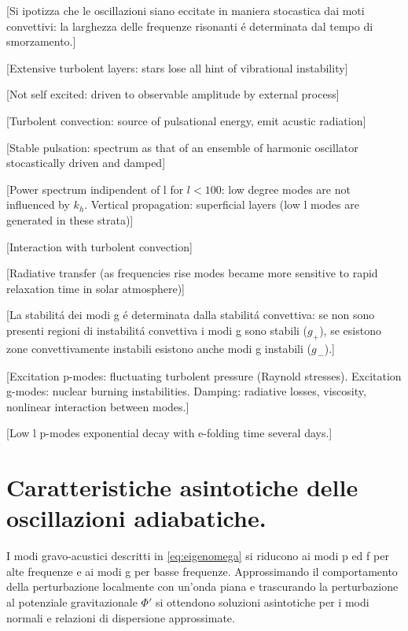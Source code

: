 \documentclass[../main.tex]{subfiles}
\begin{document}
[Si ipotizza che le oscillazioni siano eccitate in maniera stocastica dai moti convettivi: la larghezza delle frequenze risonanti \'e determinata dal tempo di smorzamento.]

[Extensive turbolent layers: stars lose all hint of vibrational instability]

[Not self excited: driven to observable amplitude by external process]

[Turbolent convection: source of pulsational energy, emit acustic radiation]

[Stable pulsation: spectrum as that of an ensemble of harmonic oscillator stocastically driven and damped]

[Power spectrum indipendent of l for $l<100$: low degree modes are not influenced by $k_h$. Vertical propagation: superficial layers (low l modes are generated in these strata)]


[Interaction with turbolent convection]

[Radiative transfer (as frequencies rise modes became more sensitive to rapid relaxation time in solar atmosphere)]

[La stabilit\'a dei modi g \'e determinata dalla stabilit\'a convettiva: se non sono presenti regioni di instabilit\'a convettiva i modi g sono stabili ($g_+$), se esistono zone convettivamente instabili esistono anche modi g instabili ($g_{\,-}$).]


[Excitation p-modes: fluctuating turbolent pressure (Raynold stresses). Excitation g-modes: nuclear burning instabilities. Damping: radiative losses, viscosity, nonlinear interaction between modes.]

[Low l p-modes exponential decay with e-folding time several days.]



{\let\clearpage\relax\let\cleardoublepage\relax           %
\chapter{Caratteristiche asintotiche delle oscillazioni adiabatiche.}\label{chap:asyntoticbehavour}
}


I modi gravo-acustici descritti in \eqref{eq:eigenomega} si riducono ai modi p ed f per alte frequenze e ai modi g per basse frequenze. Approssimando il comportamento della perturbazione localmente con un'onda piana e trascurando la perturbazione al potenziale gravitazionale $\Phi'$ si ottendono soluzioni asintotiche per i modi normali e relazioni di dispersione approssimate.
\end{document}
